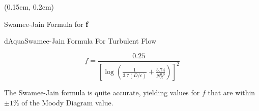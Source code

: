 \documentclass[9pt,xcolor=x11names,professionalfonts, mathserif]{beamer}
\begin{document}
											      																																																		\begin{frame}
											      																																																			\begin{textblock*}{1\columnwidth}(0.15cm, 0.2cm)
											      																																																			\end{textblock*}
											      																																																		\end{frame}
											      																																																		
											      																																																		
											      																																																		\begin{frame}{Swamee-Jain Formula for \textbf{f}}
											      																																																			
											      																																																			\begin{cmini}[0.8]{
											      																																																					\begin{cb}[10]{dAqua}{Swamee-Jain Formula For Turbulent Flow}{
											      																																																							\par\smallskip
											      																																																							\[ f = \frac{0.25}{\left[\log\left(\frac{1}{3.7\left(D/\epsilon\right)}+\frac{5.74}{N_R^{0.9}}\right)\right]^2} \]
											      																																																							\par\smallskip
											      																																																							}\end{cb}
											      																																																						\par\bigskip
											      																																																						The Swamee-Jain formula is quite accurate, yielding values for $f$ that are within $\pm 1\%$ of the Moody Diagram
											      																																																						value.
											      																																																						}\end{cmini}
											      																																																						\end{frame}
											      																																																						
\end{document}
